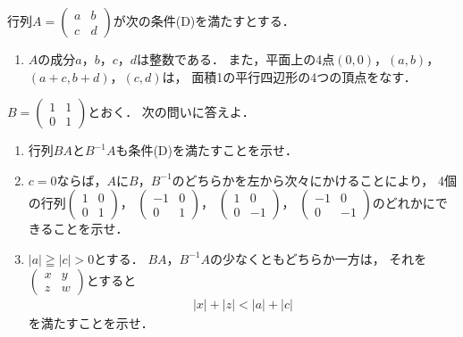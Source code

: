 \documentclass[../../main.tex]{subfiles}
\begin{document}
行列$A=
\begin{pmatrix} a & b \\ c & d
\end{pmatrix}$が次の条件(D)を満たすとする．
\begin{enumerate}
  \item[(D)] $A$の成分$a$，$b$，$c$，$d$は整数である．
    また，平面上の4点$(0,0)$，$(a,b)$，$(a+c,b+d)$，$(c,d)$は，
    面積1の平行四辺形の4つの頂点をなす．
\end{enumerate}
$B=
\begin{pmatrix} 1 & 1 \\ 0 & 1
\end{pmatrix}$とおく．
次の問いに答えよ．
\begin{enumerate}
  \item 行列$BA$と$B^{-1}A$も条件(D)を満たすことを示せ．
  \item $c=0$ならば，$A$に$B$，$B^{-1}$のどちらかを左から次々にかけることにより，
    4個の行列$
    \begin{pmatrix} 1 & 0 \\ 0 & 1
    \end{pmatrix}$，
    $
    \begin{pmatrix} -1 & 0 \\ 0 & 1
    \end{pmatrix}$，
    $
    \begin{pmatrix} 1 & 0 \\ 0 & -1
    \end{pmatrix}$，
    $
    \begin{pmatrix} -1 & 0 \\ 0 & -1
    \end{pmatrix}$のどれかにできることを示せ．
  \item $|a| \geqq |c| > 0$とする．
    $BA$，$B^{-1}A$の少なくともどちらか一方は，
    それを$
    \begin{pmatrix} x & y \\ z & w
    \end{pmatrix}$とすると
    \begin{align*}
      |x|+|z| < |a| + |c|
    \end{align*}
    を満たすことを示せ．
\end{enumerate}
\end{document}
